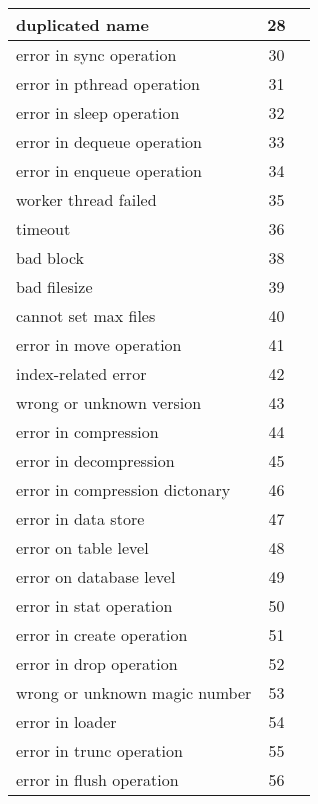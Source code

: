 \begin{center}
\begin{longtable}{||l||c||l||}
duplicated name                 &     28 & \\\hline\hline
error in sync operation         &     30 & \\\hline\hline
error in pthread operation      &     31 & \\\hline\hline
error in sleep operation        &     32 & \\\hline\hline
error in dequeue operation      &     33 & \\\hline\hline
error in enqueue operation      &     34 & \\\hline\hline
worker thread failed            &     35 & \\\hline\hline
timeout                         &     36 & \\\hline\hline
bad block                       &     38 & \\\hline\hline
bad filesize                    &     39 & \\\hline\hline
cannot set max files            &     40 & \\\hline\hline
error in move operation         &     41 & \\\hline\hline
index-related error             &     42 & \\\hline\hline
wrong or unknown version        &     43 & \\\hline\hline
error in compression            &     44 & \\\hline\hline
error in decompression          &     45 & \\\hline\hline
error in compression dictonary  &     46 & \\\hline\hline
error in data store             &     47 & \\\hline\hline
error on table level            &     48 & \\\hline\hline
error on database level         &     49 & \\\hline\hline
error in stat operation         &     50 & \\\hline\hline
error in create operation       &     51 & \\\hline\hline
error in drop operation         &     52 & \\\hline\hline
wrong or unknown magic number   &     53 & \\\hline\hline
error in loader                 &     54 & \\\hline\hline
error in trunc operation        &     55 & \\\hline\hline
error in flush operation        &     56 & \\\hline\hline

\end{longtable}
\end{center}
